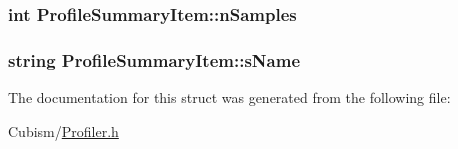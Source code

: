 \subsubsection[{n\+Samples}]{\setlength{\rightskip}{0pt plus 5cm}int Profile\+Summary\+Item\+::n\+Samples}\label{struct_profile_summary_item_adb8b4578844aaa85bd0bd7f970e23959}
\hypertarget{struct_profile_summary_item_ae37c58451ea8907b3b6580066bf48a71}{}
\subsubsection[{s\+Name}]{\setlength{\rightskip}{0pt plus 5cm}string Profile\+Summary\+Item\+::s\+Name}\label{struct_profile_summary_item_ae37c58451ea8907b3b6580066bf48a71}


The documentation for this struct was generated from the following file\+:\begin{DoxyCompactItemize}
\item 
Cubism/\hyperlink{_profiler_8h}{Profiler.\+h}\end{DoxyCompactItemize}
